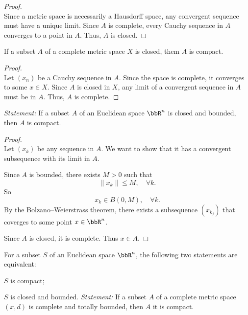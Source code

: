 \documentclass[a4paper,12pt]{article}
\begin{document}
\begin{proof}\mbox{}\\
Since a metric space is necessarily a Hausdorff space, any convergent sequence must have a unique limit. Since $A$ is complete, every Cauchy sequence in $A$ converges to a point in $A$. Thus, $A$ is closed.
\end{proof}
 If a subset $A$ of a complete metric space $X$ is closed, them $A$ is compact.

\begin{proof}\mbox{}\\
Let $(x_n)$ be a Cauchy sequence in $A$. Since the space is complete, it converges to some $x\in X$. Since $A$ is closed in $X$, any limit of a convergent sequence in $A$ must be in $A$. Thus, $A$ is complete.
\end{proof}
\textit{Statement: }If a subset $A$ of an Euclidean space $\bbR^n$ is closed and bounded, then $A$ is compact.

\begin{proof}\mbox{}\\
Let $(x_k)$ be any sequence in $A$. We want to show that it has a convergent subsequence with its limit in $A$.

Since $A$ is bounded, there exists $M>0$ such that
    \[\|x_k\|\leq M,\quad\forall k.\]
    So
    \[x_k\in B(0,M),\quad\forall k.\]
    By the Bolzano–Weierstrass theorem, there exists a subsequence $(x_{k_j})$ that coverges to some point $x\in\bbR^n$.
    
    Since $A$ is closed, it is complete. Thus $x\in A$.
\end{proof}
For a subset $S$ of an Euclidean space $\bbR^n$, the following two statements are equivalent:
\bit
\item $S$ is compact;
\item $S$ is closed and bounded.
\eit
{}
\textit{Statement: }If a subset $A$ of a complete metric space $(x,d)$ is complete and totally bounded, then $A$ it is compact.
\end{document}
